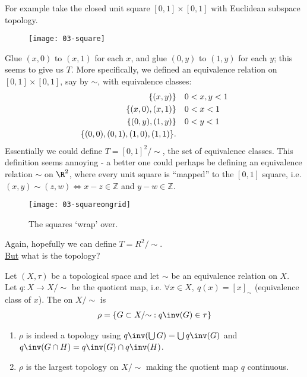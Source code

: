 For example take the closed unit square $[0,1]\times[0,1]$ with Euclidean subspace topology.
\begin{figure}[h]
    \centering
    \texttt{[image: 03-square]}
\end{figure}
Glue $(x,0)$ to $(x,1)$ for each $x$, and glue $(0,y)$ to $(1,y)$ for each $y$; this seems to give us $T$. More specifically, we defined an equivalence relation on $[0,1]\times[0,1]$, say by $\sim$, with equivalence classes:
\begin{align*}
    \{(x,y)\} & \quad 0<x,y<1\\
    \{(x,0),(x,1)\} & \quad 0<x<1\\
    \{(0,y),(1,y)\} & \quad 0<y<1\\
    \{(0,0), (0,1), (1,0), (1,1)\}.
\end{align*}
Essentially we could define $T = [0,1]^2 / {\sim}$, the set of equivalence classes.
This definition seems annoying - a better one could perhaps be defining an equivalence relation $\sim$ on $\R^2$, where every unit square is ``mapped'' to the $[0,1]$ square, i.e. $(x,y)\sim(z,w) \Leftrightarrow x-z\in \mathbb{Z}$ and $y-w\in \mathbb{Z}$.
\begin{figure}[h]
    \centering
    \texttt{[image: 03-squareongrid]}
    \caption{The squares `wrap' over.}
\end{figure}
Again, hopefully we can define $T = R^2/ {\sim}$. \\
\underline{But} what is the topology?
\begin{definition}
    Let $(X,\tau)$ be a topological space and let $\sim$ be an equivalence relation on $X$. Let $q: X\to X/ {\sim}$ be the quotient map, i.e. $\forall x \in X,\ q(x) = [x]_\sim$ (equivalence class of $x$).
    The  on $X/ {\sim}$ is
    \begin{align*}
        \rho = \Set{G\subset X/ {\sim}}{q\inv(G)\in \tau}
    \end{align*}
\end{definition}

\begin{remark}
    \begin{enumerate}
        \item $\rho$ is indeed a topology using $q\inv(\bigcup G) = \bigcup q\inv(G)$ and $q\inv (G\cap H) = q\inv(G)\cap q\inv (H)$.

        \item $\rho$ is the largest topology on $X/ {\sim}$ making the quotient map $q$ continuous.
    \end{enumerate}
\end{remark}

